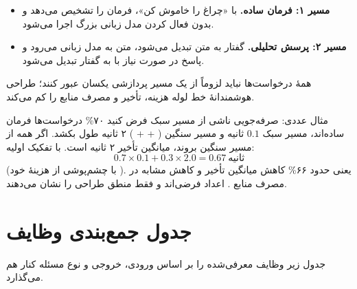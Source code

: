 \begin{itemize}
  \item \textbf{مسیر ۱: فرمان ساده.} با «چراغ را خاموش کن»،  فرمان را تشخیص می‌دهد و بدون فعال کردن مدل زبانی بزرگ اجرا می‌شود.
  \item \textbf{مسیر ۲: پرسش تحلیلی.} گفتار به متن تبدیل می‌شود، متن به مدل زبانی می‌رود و پاسخ در صورت نیاز با  به گفتار تبدیل می‌شود.
\end{itemize}
همهٔ درخواست‌ها نباید لزوماً از یک مسیر پردازشی یکسان عبور کنند؛ طراحی هوشمندانهٔ خط لوله هزینه، تأخیر و مصرف منابع را کم می‌کند.

\begin{addedbox}{مثال عددی: صرفه‌جویی ناشی از مسیر سبک}
فرض کنید ۷۰\% درخواست‌ها فرمان ساده‌اند، مسیر سبک $0.1$ ثانیه و مسیر سنگین ( +  + ) ۲ ثانیه طول بکشد. اگر همه از مسیر سنگین بروند، میانگین تأخیر ۲ ثانیه است. با تفکیک اولیه:
\[
0.7\times0.1+0.3\times2.0=0.67\ \text{ثانیه}
\]
(با چشم‌پوشی از هزینهٔ خود ). یعنی حدود ۶۶\% کاهش میانگین تأخیر و کاهش مشابه در مصرف منابع . اعداد فرضی‌اند و فقط منطق طراحی را نشان می‌دهند.
\end{addedbox}

\section{جدول جمع‌بندی وظایف}
جدول زیر وظایف معرفی‌شده را بر اساس ورودی، خروجی و نوع مسئله کنار هم می‌گذارد.

